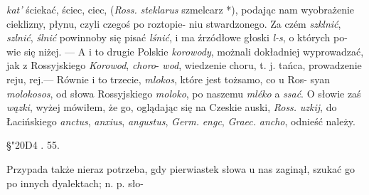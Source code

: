 \textit{kat'} ściekać, ściec, ciec, (\textit{Ross.} \textit{steklarus} szmelcarz *), podając
nam wyobrażenie cieklizny, płynu, czyli czegoś po roztopie-
niu stwardzonego. Za czém \textit{szklnić}, \textit{szlnić}, \textit{ślnić} powinnoby
się pisać \textit{lśnić}, i ma źrzódłowe głoski \textit{l-s}, o których po-
wie się niżej. --- A i to drugie Polskie \textit{korowody}, możnali
dokładniej wyprowadzać, jak z Rossyjskiego \textit{Korowod}, \textit{choro}-
\textit{wod}, wiedzenie choru, t. j. tańca, prowadzenie reju, rej.---
Równie i to trzecie, \textit{mlokos}, które jest tożsamo, co u Ros-
syan \textit{molokosos}, od słowa Rossyjskiego \textit{moloko}, po naszemu
\textit{mléko} a \textit{ssać}. O słowie zaś \textit{wązki}, wyżej mówiłem, że go,
oglądając się na Czeskie auski, \textit{Ross.} \textit{uzkij}, do Łacińskiego
\textit{anctus}, \textit{anxius}, \textit{angustus}, \textit{Germ.} \textit{engc}, \textit{Graec.} \textit{ancho}, odnieść
należy. 


\begin{center}
§\char"20D4 . 55. \\
\end{center}

Przypada także nieraz potrzeba, gdy pierwiastek słowa
u nas zaginął, szukać go po innych dyalektach; n. p. sło- 


